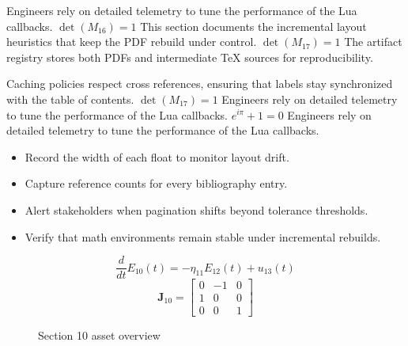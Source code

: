     Engineers rely on detailed telemetry to tune the performance of the Lua callbacks.  $\det(M_{16}) = 1$  This section documents the incremental layout heuristics that keep the PDF rebuild under control.  $\det(M_{17}) = 1$  The artifact registry stores both PDFs and intermediate TeX sources for reproducibility.
    \par
  
    Caching policies respect cross references, ensuring that labels stay synchronized with the table of contents.  $\det(M_{17}) = 1$  Engineers rely on detailed telemetry to tune the performance of the Lua callbacks.  $e^{i\pi} + 1 = 0$  Engineers rely on detailed telemetry to tune the performance of the Lua callbacks.
    \par
  
    \begin{itemize}
      
    \item Record the width of each float to monitor layout drift.
    \item Capture reference counts for every bibliography entry.
    \item Alert stakeholders when pagination shifts beyond tolerance thresholds.
    \item Verify that math environments remain stable under incremental rebuilds.
    \end{itemize}
\begin{equation}
\label{eq:sec10-eq1}
\frac{d}{dt} E_{10}(t) = -\eta_{11} E_{12}(t) + u_{13}(t)
\end{equation}
\[
\mathbf{J}_{10} = \begin{bmatrix} 0 & -1 & 0 \\ 1 & 0 & 0 \\ 0 & 0 & 1 \end{bmatrix}
\]

    \begin{figure}[htbp]
      \centering
        \caption{Section 10 asset overview}
      
        \label{fig:fig-sec10}
      
    \end{figure}
  
